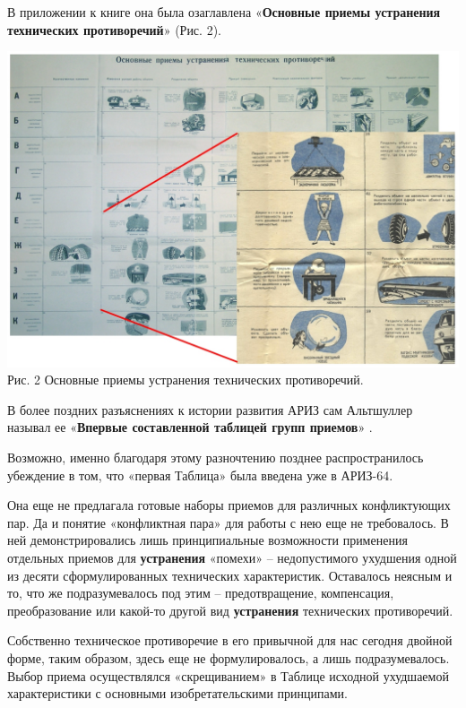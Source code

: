 \documentclass[11pt,a4paper]{article}
\begin{document}
В приложении к книге она была озаглавлена «\textbf{Основные приемы устранения
  технических противоречий}» (Рис. 2).

\begin{center}
  \includegraphics[width=.7\textwidth]{./17.jpg}\\
  Рис. 2 Основные приемы устранения технических противоречий.
\end{center}

В более поздних разъяснениях к истории развития АРИЗ сам Альтшуллер называл ее
«\textbf{Впервые составленной таблицей групп приемов}» \cite{Altshuller1986a}.

Возможно, именно благодаря этому разночтению позднее распространилось
убеждение в том, что «первая Таблица» была введена уже в АРИЗ-64.

Она еще не предлагала готовые наборы приемов для различных конфликтующих пар.
Да и понятие «конфликтная пара» для работы с нею еще не требовалось. В ней
демонстрировались лишь принципиальные возможности применения отдельных приемов
для \textbf{устранения} «помехи» -- недопустимого ухудшения одной из десяти
сформулированных технических характеристик. Оставалось неясным и то, что же
подразумевалось под этим -- предотвращение, компенсация, преобразование или
какой-то другой вид \textbf{устранения} технических противоречий.

Собственно техническое противоречие в его привычной для нас сегодня двойной
форме, таким образом, здесь еще не формулировалось, а лишь подразумевалось.
Выбор приема осуществлялся «скрещиванием» в Таблице исходной ухудшаемой
характеристики с основными изобретательскими принципами.
\end{document}
